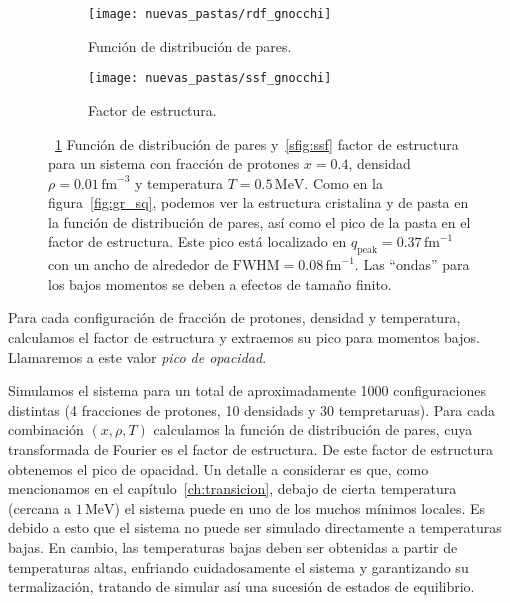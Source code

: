 \begin{figure}  \centering
  \begin{subfigure}[h!]{0.4\columnwidth}
    \centering
    \texttt{[image: nuevas\_pastas/rdf\_gnocchi]}
    \caption{Función de distribución de pares.}
      \label{sfig:gr_gnocchi}
  \end{subfigure}
  \begin{subfigure}[h!]{0.4\columnwidth}
    \centering
    \texttt{[image: nuevas\_pastas/ssf\_gnocchi]}
    \caption{Factor de estructura.}
      \label{sfig:ssf_gnocchi}
  \end{subfigure}
  \caption{~\ref{sfig:gr_gnocchi} Función de distribución de pares y~\ref{sfig:ssf} factor de estructura para un sistema con fracción de protones $x=0.4$, densidad $\rho=0.01\,\text{fm}^{-3}$ y temperatura $T=0.5\,\text{MeV}$.
    Como en la figura~\ref{fig:gr_sq}, podemos ver la estructura cristalina y de pasta en la función de distribución de pares, así como el pico de la pasta en el factor de estructura.
    Este pico está localizado en $q_\text{peak} = 0.37\,\text{fm}^{-1}$ con un ancho de alrededor de $\text{FWHM} = 0.08\,\text{fm}^{-1}$.
    Las ``ondas'' para los bajos momentos se deben a efectos de tamaño finito.}
  \label{fig:gr_sq_gnocchi}
\end{figure}


Para cada configuración de fracción de protones, densidad y temperatura, calculamos el factor de estructura y extraemos su pico para momentos bajos.
Llamaremos a este valor \emph{pico de opacidad}.

Simulamos el sistema para un total de aproximadamente 1000 configuraciones distintas (4 fracciones de protones, 10 densidads y 30 tempretaruas).
Para cada combinación $(x, \rho, T)$ calculamos la función de distribución de pares, cuya transformada de Fourier es el factor de estructura.
De este factor de estructura obtenemos el pico de opacidad.
Un detalle a considerar es que, como mencionamos en el capítulo~\ref{ch:transicion}, debajo de cierta temperatura (cercana a $1\,\text{MeV}$) el sistema puede  en uno de los muchos mínimos locales.
Es debido a esto que el sistema no puede ser simulado directamente a temperaturas bajas.
En cambio, las temperaturas bajas deben ser obtenidas a partir de temperaturas altas, enfriando cuidadosamente el sistema y garantizando su termalización, tratando de simular así una sucesión de estados de equilibrio.

